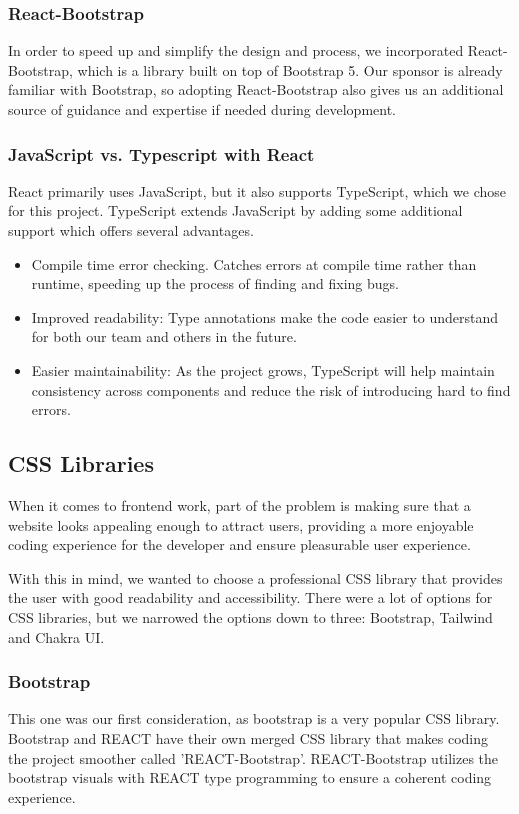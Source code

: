 \documentclass[12pt]{article}
\begin{document}
\subsubsection{React-Bootstrap}
In order to speed up and simplify the design and process, we incorporated React-Bootstrap, which is a library built on top of Bootstrap 5. Our sponsor is already familiar with Bootstrap, so adopting React-Bootstrap also gives us an additional source of guidance and expertise if needed during development.

\subsubsection{JavaScript vs. Typescript with React}
React primarily uses JavaScript, but it also supports TypeScript, which we chose for this project. TypeScript extends JavaScript by adding some additional support which offers several advantages. 
\begin{itemize}
	\item Compile time error checking. Catches errors at compile time rather than runtime, speeding up the process of finding and fixing bugs.
	\item Improved readability: Type annotations make the code easier to understand for both our team and others in the future. 
	\item Easier maintainability: As the project grows, TypeScript will help maintain consistency across components and reduce the risk of introducing hard to find errors.
\end{itemize}

\subsection{CSS Libraries}
When it comes to frontend work, part of the problem is making sure that a website looks appealing enough to attract users, providing a more enjoyable coding experience for the developer and ensure pleasurable user experience. %

With this in mind, we wanted to choose a professional CSS library that provides the user with good readability and accessibility.
There were a lot of options for CSS libraries, but we narrowed the options down to three: Bootstrap, Tailwind and Chakra UI.

\subsubsection{Bootstrap}
This one was our first consideration, as bootstrap is a very popular CSS library.
Bootstrap and REACT have their own merged CSS library that makes coding the project smoother called 'REACT-Bootstrap'.
REACT-Bootstrap utilizes the bootstrap visuals with REACT type programming to ensure a coherent coding experience.
\end{document}
